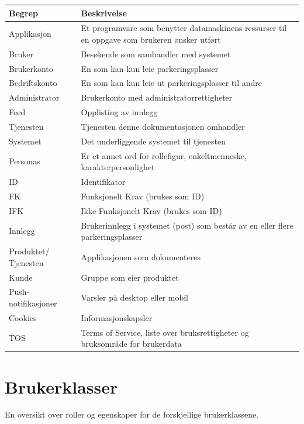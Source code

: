 \documentclass[12pt]{article}
\begin{document}
\begin{center}
    \begin{tabular}{|p{4cm}|p{12cm}|} 
        \hline
        \bf Begrep & \bf Beskrivelse\\
        \hline
        Applikasjon &  Et programvare som benytter datamaskinens ressurser til en oppgave som brukeren ønsker utført\\
        \hline
        Bruker & Besøkende som samhandler med systemet\\
        \hline
        Brukerkonto & En som kan kun leie parkeringsplasser\\
        \hline
        Bedriftskonto & En som kan kun leie ut parkeringsplasser til andre\\
        \hline
        Administrator & Brukerkonto med administratorrettigheter\\
        \hline
        Feed & Opplisting av innlegg\\
        \hline
        Tjenesten & Tjenesten denne dokumentasjonen omhandler\\
        \hline
        Systemet & Det underliggende systemet til tjenesten\\
        \hline
        Personas & Er et annet ord for rollefigur, enkeltmenneske, karakterpersonlighet\\
        \hline
        ID & Identifikator\\
        \hline
        FK & Funksjonelt Krav (brukes som ID)\\
        \hline
        IFK & Ikke-Funksjonelt Krav (brukes som ID)\\
        \hline
        Innlegg & Brukerinnlegg i systemet (post) som består av en eller flere parkeringsplasser\\
        \hline
        Produktet/ Tjenesten & Applikasjonen som dokumenteres\\
        \hline
        Kunde & Gruppe som eier produktet\\
        \hline
        Push-notifikasjoner & Varsler på desktop eller mobil \\
        \hline
        Cookies & Informasjonskapsler \\
        \hline
        TOS & Terms of Service, liste over bruksrettigheter og bruksområde for brukerdata \\
        \hline
    \end{tabular}
\end{center}

\section{Brukerklasser}
En oversikt over roller og egenskaper for de forskjellige brukerklassene.
\end{document}
